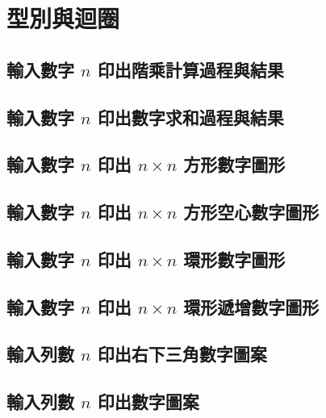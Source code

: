 \chapter{型別與迴圈}

\section{輸入數字 $n$ 印出階乘計算過程與結果}


\section{輸入數字 $n$ 印出數字求和過程與結果}


\section{輸入數字 $n$ 印出 $n\times n$ 方形數字圖形}


\section{輸入數字 $n$ 印出 $n\times n$ 方形空心數字圖形}


\section{輸入數字 $n$ 印出 $n\times n$ 環形數字圖形}


\section{輸入數字 $n$ 印出 $n\times n$ 環形遞增數字圖形}


\section{輸入列數 $n$ 印出右下三角數字圖案}


\section{輸入列數 $n$ 印出數字圖案}


